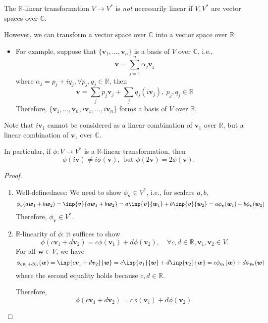 \begin{remark}
The $\mathbb{R}$-linear transformation $V\to V^*$ is \emph{not} necessarily linear if $V,V^*$ are vector spaces over $\mathbb{C}$.

However, we can transform a vector space over $\mathbb{C}$ into a vector space over $\mathbb{R}$:
\begin{itemize}
\item
For example, suppose that $\{\bm v_1,\dots,\bm v_n\}$ is a basis of $V$ over $\mathbb{C}$, i.e.,
\[
\bm v=\sum_{j=1}^n\alpha_j\bm v_j
\]
where $\alpha_j=p_j+iq_j,\forall p_j,q_j\in\mathbb{R}$, then
\[
\bm v=\sum_jp_j\bm v_j+\sum_jq_j(i\bm v_j),\ p_j,q_j\in\mathbb{R}
\]
Therefore, $\{\bm v_1,\dots,\bm v_n,i\bm v_1,\dots,i\bm v_n\}$ forms a basis of $V$ over $\mathbb{R}$.
\end{itemize}
Note that $i\bm v_1$ cannot be considered as a linear combination of $\bm v_1$ over $\mathbb{R}$, but a linear combination of $\bm v_1$ over $\mathbb{C}$.

In particular, if $\phi:V\to V^*$ is a $\mathbb{R}$-linear transformation, then 
\[
\phi(i\bm v)\ne i\phi(\bm v),\text{ but }\phi(2\bm v)=2\phi(\bm v).
\]
\end{remark}
\begin{proof}
\begin{enumerate}
\item
Well-definedness:
We need to show $\phi_{\bm v}\in V^*$, i.e., for scalars $a,b$,
\[
\phi_{\bm v}(a\bm w_1+b\bm w_2)
=
\inp{\bm v}{a\bm w_1+b\bm w_2}
=
a\inp{\bm v}{\bm w_1}+b\inp{\bm v}{\bm w_2}
=
a\phi_{\bm v}(\bm w_1)+b\phi_{\bm v}(\bm w_2)
\]
Therefore, $\phi_{\bm v}\in V^*$.
\item
$\mathbb{R}$-linearity of $\phi$: it suffices to show 
\[
\phi(c\bm v_1+d\bm v_2)=c\phi(\bm v_1)+d\phi(\bm v_2),\quad
\forall c,d\in\mathbb{R},\bm v_1,\bm v_2\in V.
\]
For all $\bm w\in V$, we have
\[
\phi_{c\bm v_1+d\bm v_2}(\bm w)
=
\inp{c\bm v_1+d\bm v_2}{\bm w}
=
c\inp{\bm v_1}{\bm w}
+
d\inp{\bm v_2}{\bm w}
=
c\phi_{\bm v_1}(\bm w)+d\phi_{\bm v_2}(\bm w)
\]
where the second equality holds because $c,d\in\mathbb{R}$.

Therefore,
\[
\phi(c\bm v_1+d\bm v_2)=c\phi(\bm v_1)+d\phi(\bm v_2).
\]
\end{enumerate}
\end{proof}

















